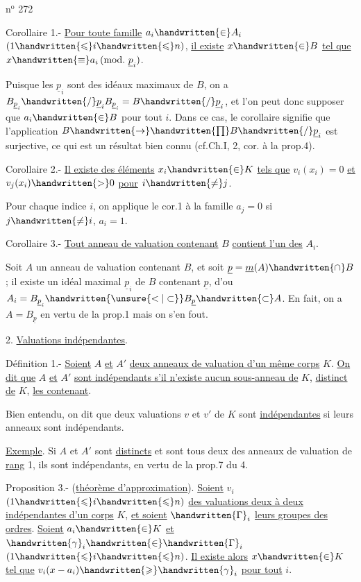 \hfill n$^{\mathrm{o}}$ 272

Corollaire 1.- \uline{Pour toute famille} $a_i\handwritten{\in} A_i$ $(1\handwritten{\leqslant}i\handwritten{\leqslant}n)$, \uline{il existe} $x\handwritten{\in}B$ \uline{tel que} $x\handwritten{\equiv}a_i\,(\mathrm{mod.}\ \underline{p}_i)$.

Puisque les $\underline{p}_i$ sont des idéaux maximaux de $B$, on a $B_{\underline{p}_i}\handwritten{/}\underline{p}_i B_{\underline{p}_i}=B\handwritten{/}\underline{p}_i$, et l'on peut donc supposer que $a_i\handwritten{\in}B$ pour tout $i$. Dans ce cas, le corollaire signifie que l'application $B\handwritten{\to}\handwritten{\prod} B\handwritten{/}\underline{p}_i$ est surjective, ce qui est un résultat bien connu (cf.Ch.I, \handwritten{\S}2, cor. à la prop.4).

Corollaire 2.- \uline{Il existe des éléments} $x_i\handwritten{\in}K$ \uline{tels que} $v_i(x_i)=0$ \uline{et} $v_j(x_i)\handwritten{>}0$ \uline{pour} $i\handwritten{\ne}j$.

Pour chaque indice $i$, on applique le cor.1 à la famille $a_j=0$ si $j\handwritten{\ne}i$, $a_i=1$.

Corollaire 3.- \uline{Tout anneau de valuation contenant} $B$ \uline{contient l'un des} $A_i$.

Soit $A$ un anneau de valuation contenant $B$, et soit $\underline{p}=\underline{m}(A)\handwritten{\cap}B$; il existe un idéal maximal $\underline{p}_i$ de $B$ contenant $\underline{p}$, d'ou $A_i=B_{\underline{p}_i}\handwritten{\unsure{<|\subset}}B_{\underline p}\handwritten{\subset}A$. \handwritten{[}En fait, on a $A=B_{\underline p}$ en vertu de la prop.1\unsure{;|,} mais on s'en fout.\handwritten{]}

2. \uline{Valuations indépendantes}.

Définition 1.- \uline{Soient} $A$ \uline{et} $A'$ \uline{deux anneaux de valuation d'un même corps} $K$. \uline{On dit que} $A$ \uline{et} $A'$ \uline{sont indépendants s'il n'existe aucun sous-anneau de} $K$, \uline{distinct de} $K$, \uline{les contenant}.

Bien entendu, on dit que deux valuations $v$ et $v'$ de $K$ sont \uline{indépendantes} si leurs anneaux sont indépendants.

\uline{Exemple}. Si $A$ et $A'$ sont \uline{distincts} et sont tous deux des anneaux de valuation de \uline{rang} 1, ils sont indépendants, en vertu de la prop.7 du \handwritten{\S}4.

Proposition 3.- (\uline{théorème d'approximation}). \uline{Soient} $v_i$ $(1\handwritten{\leqslant}i\handwritten{\leqslant}n)$ \uline{des valuations deux à deux indépendantes d'un corps} $K$, \uline{et soient} $\handwritten{\Gamma}_i$ \uline{leurs groupes des ordres}. \uline{Soient} $a_i\handwritten{\in}K$ \uline{et} $\handwritten{\gamma}_i\handwritten{\in}\handwritten{\Gamma}_i$ $(1\handwritten{\leqslant}i\handwritten{\leqslant}n)$. \uline{Il existe alors} $x\handwritten{\in}K$ \uline{tel que} $v_i(x-a_i)\handwritten{\geqslant}\handwritten{\gamma}_i$ \uline{pour tout} $i$.

